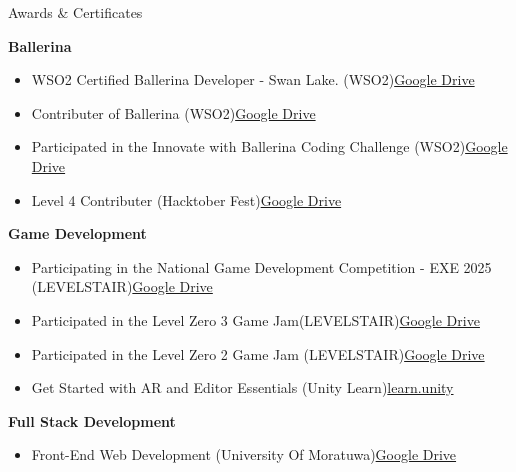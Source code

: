 \documentclass{resume} %
\begin{document}
\begin{rSection}{Awards \& Certificates}
\item \textbf{Ballerina}
\begin{itemize}
    \itemsep -3pt {}
    \item WSO2 Certified Ballerina Developer - Swan Lake. (WSO2)\hfill \href{https://drive.google.com/file/d/1NMCyY4b_ExnblCQ6gIN4fLDlVEuvpu2_/view?usp=sharing}{Google Drive}
    \item Contributer of Ballerina (WSO2)\hfill \href{https://drive.google.com/file/d/1SgRCvWZDT8lnfLIgifV5ag5YYIJSSZ83/view?usp=drive_link}{Google Drive}
    \item Participated in the Innovate with Ballerina Coding Challenge (WSO2)\hfill \href{https://drive.google.com/file/d/1NSFzD-_UsUM-WQ4jqP0YVt12NVZKzX4J/view?usp=drive_link}{Google Drive}
    \item Level 4 Contributer (Hacktober Fest)\hfill \href{https://drive.google.com/file/d/1igEOCndLEjKHLd6FzaZIjAYJDQEqjV2J/view?usp=drive_link}{Google Drive}
\end{itemize}
\item \textbf{Game Development}
\begin{itemize}
    \itemsep -3pt {}
    \item Participating in the National Game Development Competition - EXE 2025 (LEVELSTAIR)\hfill \href{https://drive.google.com/file/d/1Z8m7bNJqP24FJAfpuU0tM-tQQUx9okW2/view?usp=drive_link}{Google Drive}
    \item Participated in the Level Zero 3 Game Jam(LEVELSTAIR)\hfill \href{https://drive.google.com/file/d/1ACsq_kPHJ1nCdPq4FLYcNu0p52xsFXde/view?usp=drive_link}{Google Drive}
    \item Participated in the Level Zero 2 Game Jam (LEVELSTAIR)\hfill \href{https://drive.google.com/file/d/1VdSnmT8Y1LtkyJ0gZ4VAVrP549ElTG4Y/view?usp=drive_link}{Google Drive}
    \item Get Started with AR and Editor Essentials (Unity Learn)\hfill \href{https://learn.unity.com/u/621279f6edbc2a7b6b9fbc9a}{learn.unity}
\end{itemize}
\item \textbf{ Full Stack Development}
\begin{itemize}
    \itemsep -3pt {}
    \item Front-End Web Development (University Of Moratuwa)\hfill \href{https://drive.google.com/file/d/1kLSSzzKu4FM7Qh-Jimj9iXqyyGClFURe/view?usp=drive_link}{Google Drive}

\end{itemize}
\end{rSection}
\end{document}
